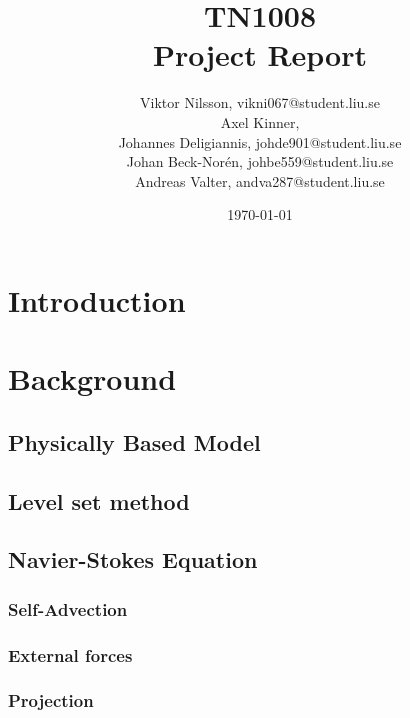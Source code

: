 \documentclass[]{report}   %
\begin{document}
\title{TN1008\\ Project Report}   %
\author{
  Viktor Nilsson, vikni067@student.liu.se 
  \\Axel Kinner,
  \\Johannes Deligiannis, johde901@student.liu.se
  \\Johan Beck-Norén, johbe559@student.liu.se
  \\Andreas Valter, andva287@student.liu.se
	}
        \date{\today}    %
        \maketitle
        
\setcounter{page}{2}



\begingroup
\let\clearpage\relax %
\chapter{Introduction}


\chapter{Background}
\section{Physically Based Model}

\section{Level set method}

\section{Navier-Stokes Equation}

\subsection{Self-Advection}

\subsection{External forces}

\subsection{Projection}

\end{document}
